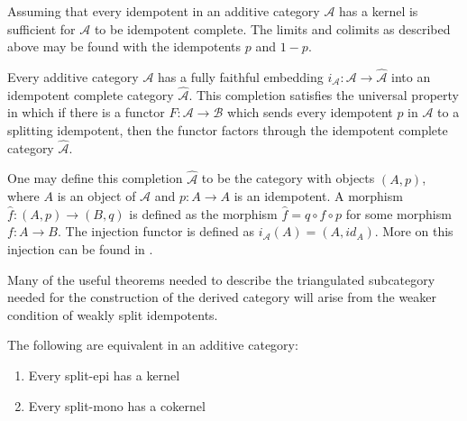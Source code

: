     \begin{remark}
        Assuming that every idempotent in an additive category $\mathcal{A}$ has a kernel is sufficient for $\mathcal{A}$ to be idempotent complete. The limits and colimits as described above may be found with the idempotents $p$ and $1-p$.
    \end{remark}

    Every additive category $\mathcal{A}$ has a fully faithful embedding $i_{\mathcal{A}}:\mathcal{A}\rightarrow \widehat{\mathcal{A}}$ into an idempotent complete category $\widehat{\mathcal{A}}$. This completion satisfies the universal property in which if there is a functor $F:\mathcal{A}\rightarrow\mathcal{B}$ which sends every idempotent $p$ in $\mathcal{A}$ to a splitting idempotent, then the functor factors through the idempotent complete category $\widehat{\mathcal{A}}$.

    \begin{center}
    \end{center}

    One may define this completion $\widehat{\mathcal{A}}$ to be the category with objects $(A,p)$, where $A$ is an object of $\mathcal{A}$ and $p:A\rightarrow A$ is an idempotent. A morphism $\widehat{f}:(A,p)\rightarrow (B,q)$ is defined as the morphism $\widehat{f} = q \circ f \circ p$ for some morphism $f:A\rightarrow B$. The injection functor is defined as $i_{\mathcal{A}}(A)=(A,id_A)$. More on this injection can be found in \cite{buhler}.
    
    Many of the useful theorems needed to describe the triangulated subcategory needed for the construction of the derived category will arise from the weaker condition of weakly split idempotents.

    \begin{lemma}
        The following are equivalent in an additive category:
        \begin{enumerate}
            \item Every split-epi has a kernel
            \item Every split-mono has a cokernel
        \end{enumerate}
    \end{lemma}

